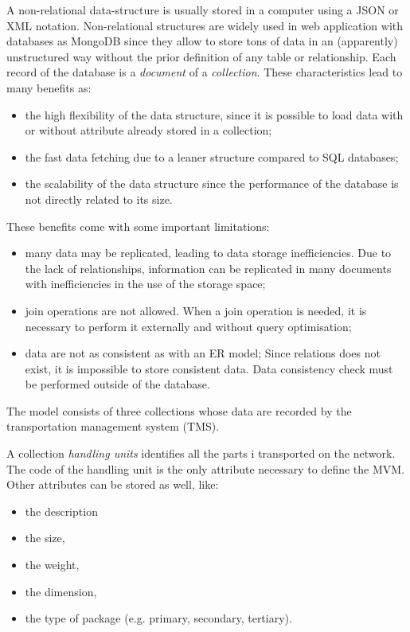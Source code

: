 A non-relational data-structure is usually stored in a computer using a JSON or XML notation. Non-relational structures are widely used in web application with databases as MongoDB since they allow to store tons of data in an (apparently) unstructured way without the prior definition of any table or relationship. Each record of the database is a \textit{document} of a \textit{collection}. These characteristics lead to many benefits as:

\begin{itemize}
    \item the high flexibility of the data structure, since it is possible to load data with or without attribute already stored in a collection;
    \item the fast data fetching due to a leaner structure compared to SQL databases;
    \item the scalability of the data structure since the performance of the database is not directly related to its size.

\end{itemize}

These benefits come with some important limitations:

\begin{itemize}
    \item many data may be replicated, leading to data storage inefficiencies. Due to the lack of relationships, information can be replicated in many documents with inefficiencies in the use of the storage space;
    \item join operations are not allowed. When a join operation is needed, it is necessary to perform it externally and without query optimisation;
    \item data are not as consistent as with an ER model; Since relations does not exist, it is impossible to store consistent data. Data consistency check must be performed outside of the database.

\end{itemize}

The model consists of three collections whose data are recorded by the transportation management system (TMS). \par

A collection \textit{handling units} identifies all the parts i transported on the network. The code of the handling unit is the only attribute necessary to define the MVM. Other attributes can be stored as well, like:

\begin{itemize}
    \item the description
	\item the size, 
    \item the weight,
    \item the dimension,
    \item the type of package (e.g. primary, secondary, tertiary).
\end{itemize}

